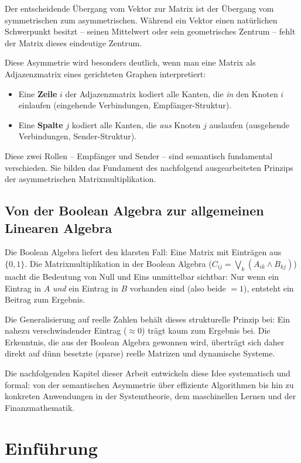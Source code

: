 \documentclass[a4paper,12pt]{report}
\theoremstyle{definition}
\begin{document}
	Der entscheidende Übergang vom Vektor zur Matrix ist der Übergang vom symmetrischen zum asymmetrischen. Während ein Vektor einen natürlichen Schwerpunkt besitzt -- seinen Mittelwert oder sein geometrisches Zentrum -- fehlt der Matrix dieses eindeutige Zentrum.

	Diese Asymmetrie wird besonders deutlich, wenn man eine Matrix als Adjazenzmatrix eines gerichteten Graphen interpretiert:
	\begin{itemize}
		\item Eine \textbf{Zeile} $i$ der Adjazenzmatrix kodiert alle Kanten, die \emph{in} den Knoten $i$ einlaufen (eingehende Verbindungen, Empfänger-Struktur).
		\item Eine \textbf{Spalte} $j$ kodiert alle Kanten, die \emph{aus} Knoten $j$ auslaufen (ausgehende Verbindungen, Sender-Struktur).
	\end{itemize}

	Diese zwei Rollen -- Empfänger und Sender -- sind semantisch fundamental verschieden. Sie bilden das Fundament des nachfolgend ausgearbeiteten Prinzips der asymmetrischen Matrixmultiplikation.

	\section{Von der Boolean Algebra zur allgemeinen Linearen Algebra}

	Die Boolean Algebra liefert den klarsten Fall: Eine Matrix mit Einträgen aus $\{0, 1\}$. Die Matrixmultiplikation in der Boolean Algebra ($C_{ij} = \bigvee_k (A_{ik} \wedge B_{kj})$) macht die Bedeutung von Null und Eins unmittelbar sichtbar: Nur wenn ein Eintrag in $A$ \emph{und} ein Eintrag in $B$ vorhanden sind (also beide $= 1$), entsteht ein Beitrag zum Ergebnis.

	Die Generalisierung auf reelle Zahlen behält dieses strukturelle Prinzip bei: Ein nahezu verschwindender Eintrag ($\approx 0$) trägt kaum zum Ergebnis bei. Die Erkenntnis, die aus der Boolean Algebra gewonnen wird, überträgt sich daher direkt auf dünn besetzte (sparse) reelle Matrizen und dynamische Systeme.

	Die nachfolgenden Kapitel dieser Arbeit entwickeln diese Idee systematisch und formal: von der semantischen Asymmetrie über effiziente Algorithmen bis hin zu konkreten Anwendungen in der Systemtheorie, dem maschinellen Lernen und der Finanzmathematik.

	\chapter{Einführung}
	
\end{document}
